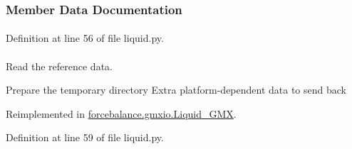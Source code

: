 \subsubsection{\-Member \-Data \-Documentation}
\hypertarget{classforcebalance_1_1liquid_1_1Liquid_af7ba85e825dfe42a384c2eb2e7cc1f0c}{
\paragraph[{do\-\_\-self\-\_\-pol}]{}}\label{classforcebalance_1_1liquid_1_1Liquid_af7ba85e825dfe42a384c2eb2e7cc1f0c}


\-Definition at line 56 of file liquid.\-py.

\hypertarget{classforcebalance_1_1liquid_1_1Liquid_a3d7e00beaf0c7d71751699e05b87c501}{
\paragraph[{extra\-\_\-output}]{}}\label{classforcebalance_1_1liquid_1_1Liquid_a3d7e00beaf0c7d71751699e05b87c501}


\-Read the reference data. 

\-Prepare the temporary directory \-Extra platform-\/dependent data to send back 

\-Reimplemented in \hyperlink{classforcebalance_1_1gmxio_1_1Liquid__GMX_ac9f30f5bafc9355de1694e3e2e7e8871}{forcebalance.\-gmxio.\-Liquid\-\_\-\-G\-M\-X}.



\-Definition at line 59 of file liquid.\-py.

\hypertarget{classforcebalance_1_1target_1_1Target_a796dc30a19a60c63fb43b088d40a963f}{
\paragraph[{\-F\-F}]{}}\label{classforcebalance_1_1target_1_1Target_a796dc30a19a60c63fb43b088d40a963f}


